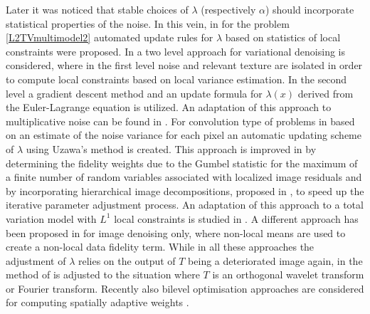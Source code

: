 \documentclass[enabledeprecatedfontcommands,cleardoublepage=empty,headsepline,twoside,11pt,DIV=15,BCOR=12mm,final]{scrartcl}
\begin{document}
Later it was noticed that stable choices of $\lambda$ (respectively $\alpha$) should incorporate statistical properties of the noise. In this vein, in \cite{AlmBalCasHar, DonHinRin, GilSocZee} for the problem \eqref{L2TVmultimodel2} automated update rules for $\lambda$ based on statistics of local constraints were proposed. In \cite{GilSocZee} a two level approach for variational denoising is considered, where in the first level noise and relevant texture are isolated in order to compute local constraints based on local variance estimation. In the second level a gradient descent method and an update formula for $\lambda(x)$ derived from the Euler-Lagrange equation is utilized. An adaptation of this approach to multiplicative noise can be found in \cite{LiNgShe}. For convolution type of problems in \cite{AlmBalCasHar} based on an estimate of the noise variance for each pixel an automatic updating scheme of $\lambda$ using Uzawa's method is created. This approach is improved in \cite{DonHinRin} by determining the fidelity weights due to the Gumbel statistic for the maximum of a finite number of random variables associated with localized image residuals and by incorporating hierarchical image decompositions, proposed in \cite{TadNezVes2004,TadNezVes2008}, to speed up the iterative parameter adjustment process. An adaptation of this approach to a total variation model with $L^1$ local constraints is studied in \cite{HinRin}. A different approach has been proposed in \cite{SutDelAuj} for image denoising only, where non-local means \cite{BuaColMor} are used to create a non-local data fidelity term. While in all these approaches the adjustment of $\lambda$ relies on the output of $T$ being a deteriorated image again, in \cite{HinLan2015} the method of \cite{DonHinRin} is adjusted to the situation where $T$ is an orthogonal wavelet transform or Fourier transform. Recently also bilevel optimisation approaches are considered for computing spatially adaptive weights \cite{ChuDeLSch,HinRau,HinRauWuLan}.
\end{document}
